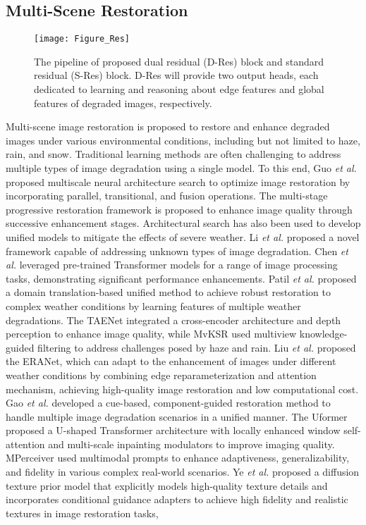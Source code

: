 \documentclass[final,12pt]{elsarticle}
\begin{document}
\subsection{Multi-Scene Restoration}
%
    \begin{figure*}[t]
        \centering
        \setlength{\abovecaptionskip}{0.cm}
        \texttt{[image: Figure\_Res]}
        \caption{The pipeline of proposed dual residual (D-Res) block and standard residual (S-Res) block. D-Res will provide two output heads, each dedicated to learning and reasoning about edge features and global features of degraded images, respectively.}
        \label{Figure_Res}
    \end{figure*}
    Multi-scene image restoration is proposed to restore and enhance degraded images under various environmental conditions, including but not limited to haze, rain, and snow. Traditional learning methods are often challenging to address multiple types of image degradation using a single model. To this end, Guo \textit{et al.} \citep{gou2020clearer} proposed multiscale neural architecture search to optimize image restoration by incorporating parallel, transitional, and fusion operations. The multi-stage progressive restoration framework \citep{zamir2021multi} is proposed to enhance image quality through successive enhancement stages. Architectural search \citep{li2020all} has also been used to develop unified models to mitigate the effects of severe weather. Li \textit{et al.} \citep{li2022all} proposed a novel framework capable of addressing unknown types of image degradation. Chen \textit{et al.} \citep{chen2021pre} leveraged pre-trained Transformer models for a range of image processing tasks, demonstrating significant performance enhancements. Patil \textit{et al.} \citep{patil2023multi} proposed a domain translation-based unified method to achieve robust restoration to complex weather conditions by learning features of multiple weather degradations. The TAENet \citep{fang2024taenet} integrated a cross-encoder architecture and depth perception to enhance image quality, while MvKSR \citep{xu2024mvksr} used multiview knowledge-guided filtering to address challenges posed by haze and rain. Liu \textit{et al.} \citep{liu2024real} proposed the ERANet, which can adapt to the enhancement of images under different weather conditions by combining edge reparameterization and attention mechanism, achieving high-quality image restoration and low computational cost. Gao \textit{et al.} \citep{gao2024prompt} developed a cue-based, component-guided restoration method to handle multiple image degradation scenarios in a unified manner. The Uformer \citep{wang2022uformer} proposed a U-shaped Transformer architecture with locally enhanced window self-attention and multi-scale inpainting modulators to improve imaging quality. MPerceiver \citep{ai2024multimodal} used multimodal prompts to enhance adaptiveness, generalizability, and fidelity in various complex real-world scenarios. Ye \textit{et al.} \citep{ye2024learning} proposed a diffusion texture prior model that explicitly models high-quality texture details and incorporates conditional guidance adapters to achieve high fidelity and realistic textures in image restoration tasks, 
\end{document}
